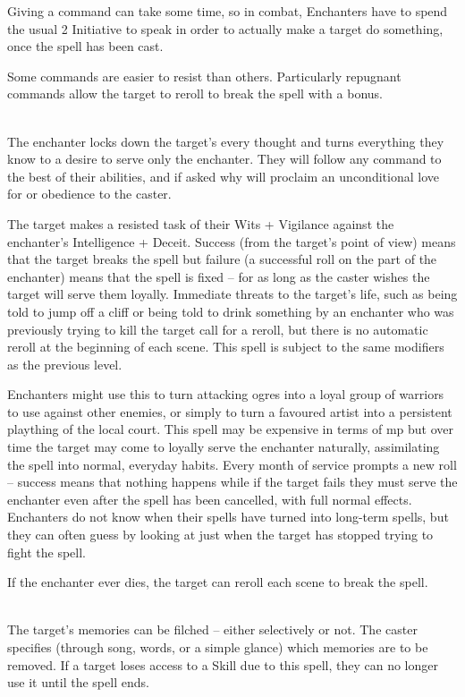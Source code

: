 \begin{multicols}{2}

Giving a command can take some time, so in combat, Enchanters have to spend the usual 2 Initiative to speak in order to actually make a target do something, once the spell has been cast.

Some commands are easier to resist than others. Particularly repugnant commands allow the target to reroll to break the spell with a bonus.

\spelllevel

\\
The enchanter locks down the target's every thought and turns everything they know to a desire to serve only the enchanter. They will follow any command to the best of their abilities, and if asked why will proclaim an unconditional love for or obedience to the caster.

The target makes a resisted task of their Wits + Vigilance against the enchanter's Intelligence + Deceit. Success (from the target's point of view) means that the target breaks the spell but failure (a successful roll on the part of the enchanter) means that the spell is fixed -- for as long as the caster wishes the target will serve them loyally. Immediate threats to the target's life, such as being told to jump off a cliff or being told to drink something by an enchanter who was previously trying to kill the target call for a reroll, but there is no automatic reroll at the beginning of each scene. This spell is subject to the same modifiers as the previous level.

Enchanters might use this to turn attacking ogres into a loyal group of warriors to use against other enemies, or simply to turn a favoured artist into a persistent plaything of the local court. This spell may be expensive in terms of \gls{mp} but over time the target may come to loyally serve the enchanter naturally, assimilating the spell into normal, everyday habits. Every month of service prompts a new roll -- success means that nothing happens while if the target fails they must serve the enchanter even after the spell has been cancelled, with full normal effects. Enchanters do not know when their spells have turned into long-term spells, but they can often guess by looking at just when the target has stopped trying to fight the spell.

If the enchanter ever dies, the target can reroll each scene to break the spell.

\\
The target's memories can be filched -- either selectively or not. The caster specifies (through song, words, or a simple glance) which memories are to be removed. If a target loses access to a Skill due to this spell, they can no longer use it until the spell ends.


\end{multicols}
